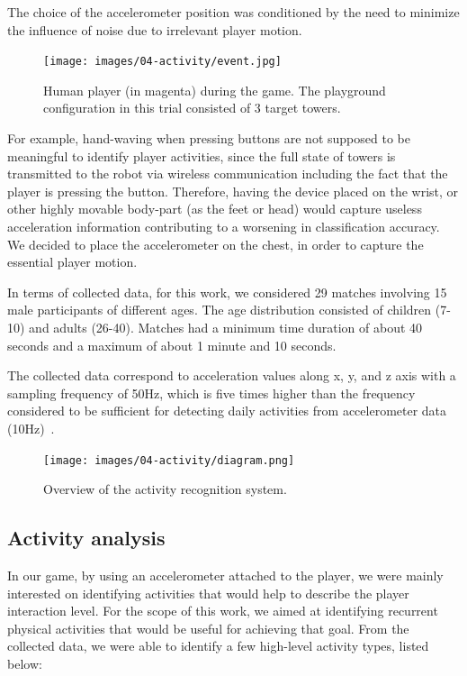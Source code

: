 The choice of the accelerometer position was conditioned by the need to minimize the influence of noise due to irrelevant player motion.

\begin{figure}[thpb]
      \centering
      {\texttt{[image: images/04-activity/event.jpg]}}
      \caption{Human player (in magenta) during the game. The playground configuration in this trial consisted of 3 target towers.}
      \label{game}
\end{figure}

For example, hand-waving when pressing buttons are not supposed to be meaningful to identify player activities, since the full state of towers is transmitted to the robot via wireless communication including the fact that the player is pressing the button. Therefore, having the device placed on the wrist, or other highly movable body-part (as the feet or head) would capture useless acceleration information contributing to a worsening in classification accuracy. We decided to place the accelerometer on the chest, in order to capture the essential player motion.

In terms of collected data, for this work, we considered 29 matches involving 15 male participants of different ages. The age distribution consisted of children (7-10) and adults (26-40). Matches had a minimum time duration of about 40 seconds and a maximum of about 1 minute and 10 seconds. 

The collected data correspond to acceleration values along x, y, and z axis with a sampling frequency of 50Hz, which is five times higher than the frequency considered to be sufficient for detecting daily activities from accelerometer data (10Hz)~\citep{atallah_sensor_2010, ravi_activity_2005, kikhia_analyzing_2014}.

\begin{figure}[!t]
\normalsize
      \centering
      {\texttt{[image: images/04-activity/diagram.png]}}
      \caption{Overview of the activity recognition system.}
      \label{approach}
\end{figure}
  
\subsection{Activity analysis}\label{sec:activity_analysis}

In our game, by using an accelerometer attached to the player, we were mainly interested on identifying activities that would help to describe the player interaction level. For the scope of this work, we aimed at identifying recurrent physical activities that would be useful for achieving that goal. From the collected data, we were able to identify a few high-level activity types, listed below:

